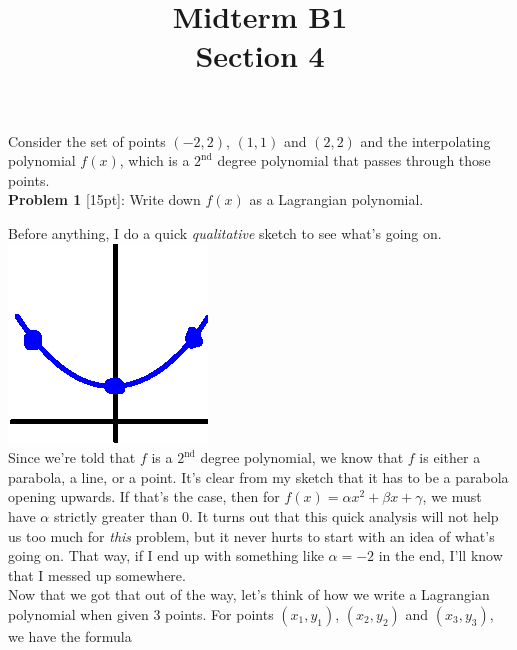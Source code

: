 \documentclass{article}
\def\a{\alpha}
\def\b{\beta}
\def\c{\gamma}
\begin{document}
 
 
 
\title{
    \textmd{\Huge{Midterm B1}}\\
    \textmd{\huge{Section 4}}
}


\maketitle

Consider the set of points $(-2, 2)$, $(1, 1)$ and $(2, 2)$ and the interpolating polynomial $f(x)$, which is a $2^\text{nd}$ degree polynomial that passes through those points. \\

\textbf{Problem 1} [15pt]: Write down $f(x)$ as a Lagrangian polynomial.

Before anything, I do a quick \textit{qualitative} sketch to see what's going on. \hspace*{3cm}\includegraphics[scale=0.5]{thumbSketch}\\

Since we're told that $f$ is a $2^\text{nd}$ degree polynomial, we know that $f$ is either a parabola, a line, or a point. It's clear from my sketch that it has to be a parabola opening upwards. If that's the case, then for $f(x) = \a x^2 + \b x + \c$, we must have $\a$ strictly greater than $0$. It turns out that this quick analysis will not help us too much for \textit{this} problem, but it never hurts to start with an idea of what's going on. That way, if I end up with something like $\a = -2$ in the end, I'll know that I messed up somewhere. \\

Now that we got that out of the way, let's think of how we write a Lagrangian polynomial when given 3 points. For points $(x_1, y_1)$, $(x_2, y_2)$ and $(x_3, y_3)$, we have the formula \\
\end{document}
